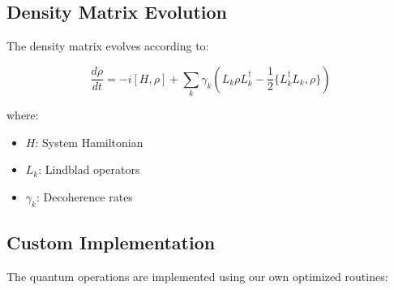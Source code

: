 \documentclass[10pt]{article}
\begin{document}
\subsection{Density Matrix Evolution}
The density matrix evolves according to:

\begin{equation}
    \frac{d\rho}{dt} = -i[H, \rho] + \sum_k \gamma_k(L_k\rho L_k^\dagger - \frac{1}{2}\{L_k^\dagger L_k, \rho\})
\end{equation}

where:
\begin{itemize}
    \item $H$: System Hamiltonian
    \item $L_k$: Lindblad operators
    \item $\gamma_k$: Decoherence rates
\end{itemize}

\subsection{Custom Implementation}
The quantum operations are implemented using our own optimized routines:
\end{document}
